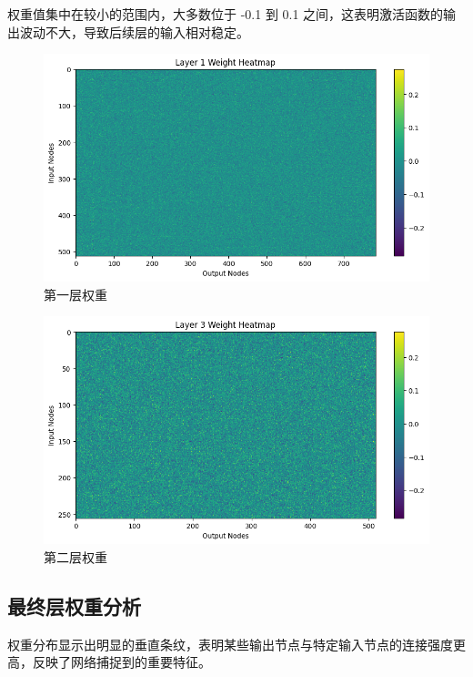 \documentclass[a4paper,12pt]{article}
\begin{document}
权重值集中在较小的范围内，大多数位于 -0.1 到 0.1 之间，这表明激活函数的输出波动不大，导致后续层的输入相对稳定。


\begin{figure}[H]
    \centering
    \includegraphics[width=1\textwidth]{layer1.png}
    \caption{第一层权重}
    \label{fig:example}
\end{figure}

\begin{figure}[H]
    \centering
    \includegraphics[width=1\textwidth]{layer2.png}
    \caption{第二层权重}
    \label{fig:example}
\end{figure}



\subsection{最终层权重分析}

权重分布显示出明显的垂直条纹，表明某些输出节点与特定输入节点的连接强度更高，反映了网络捕捉到的重要特征。
\end{document}
